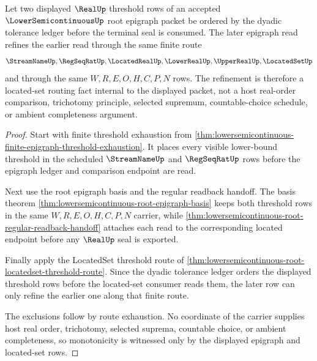 \begin{theorem}
\label{thm:lower-semicontinuous-epigraph-threshold-monotonicity}
Let two displayed $\RealUp$ threshold rows of an accepted $\LowerSemicontinuousUp$ root epigraph packet be ordered by the dyadic tolerance ledger before the terminal seal is consumed. The later epigraph read refines the earlier read through the same finite route
$$
\StreamNameUp,\RegSeqRatUp,\LocatedRealUp,\LowerRealUp,\UpperRealUp,\LocatedSetUp
$$
and through the same $W,R,E,O,H,C,P,N$ rows. The refinement is therefore a located-set routing fact internal to the displayed packet, not a host real-order comparison, trichotomy principle, selected supremum, countable-choice schedule, or ambient completeness argument.
\end{theorem}
\begin{proof}
Start with finite threshold exhaustion from \autoref{thm:lowersemicontinuous-finite-epigraph-threshold-exhaustion}. It places every visible lower-bound threshold in the scheduled $\StreamNameUp$ and $\RegSeqRatUp$ rows before the epigraph ledger and comparison endpoint are read.

Next use the root epigraph basis and the regular readback handoff. The basis theorem \autoref{thm:lowersemicontinuous-root-epigraph-basis} keeps both threshold rows in the same $W,R,E,O,H,C,P,N$ carrier, while \autoref{thm:lowersemicontinuous-root-regular-readback-handoff} attaches each read to the corresponding located endpoint before any $\RealUp$ seal is exported.

Finally apply the LocatedSet threshold route of \autoref{thm:lowersemicontinuous-root-locatedset-threshold-route}. Since the dyadic tolerance ledger orders the displayed threshold rows before the located-set consumer reads them, the later row can only refine the earlier one along that finite route.

The exclusions follow by route exhaustion. No coordinate of the carrier supplies host real order, trichotomy, selected suprema, countable choice, or ambient completeness, so monotonicity is witnessed only by the displayed epigraph and located-set rows.
\end{proof}

